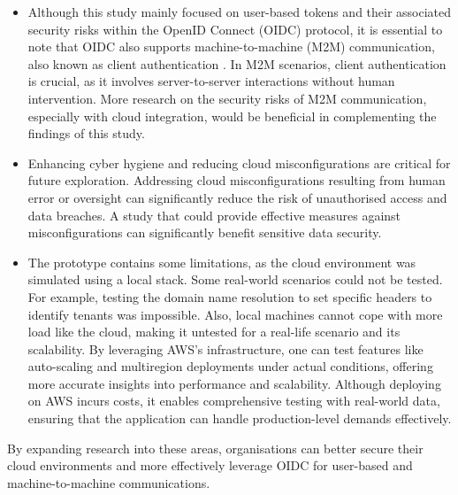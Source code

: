\begin{itemize} 
    
    \item Although this study mainly focused on user-based tokens and their associated security risks within the OpenID Connect (OIDC) protocol, it is essential to note that OIDC also supports machine-to-machine (M2M) communication, also known as client authentication \citep{openid_docs}. In M2M scenarios, client authentication is crucial, as it involves server-to-server interactions without human intervention. More research on the security risks of M2M communication, especially with cloud integration, would be beneficial in complementing the findings of this study.

    \item Enhancing cyber hygiene and reducing cloud misconfigurations are critical for future exploration. Addressing cloud misconfigurations resulting from human error or oversight can significantly reduce the risk of unauthorised access and data breaches. A study that could provide effective measures against misconfigurations can significantly benefit sensitive data security.

    \item The prototype contains some limitations, as the cloud environment was simulated using a local stack. Some real-world scenarios could not be tested. For example, testing the domain name resolution to set specific headers to identify tenants was impossible. Also, local machines cannot cope with more load like the cloud, making it untested for a real-life scenario and its scalability. By leveraging AWS's infrastructure, one can test features like auto-scaling and multiregion deployments under actual conditions, offering more accurate insights into performance and scalability. Although deploying on AWS incurs costs, it enables comprehensive testing with real-world data, ensuring that the application can handle production-level demands effectively.
\end{itemize}






By expanding research into these areas, organisations can better secure their cloud environments and more effectively leverage OIDC for user-based and machine-to-machine communications.


